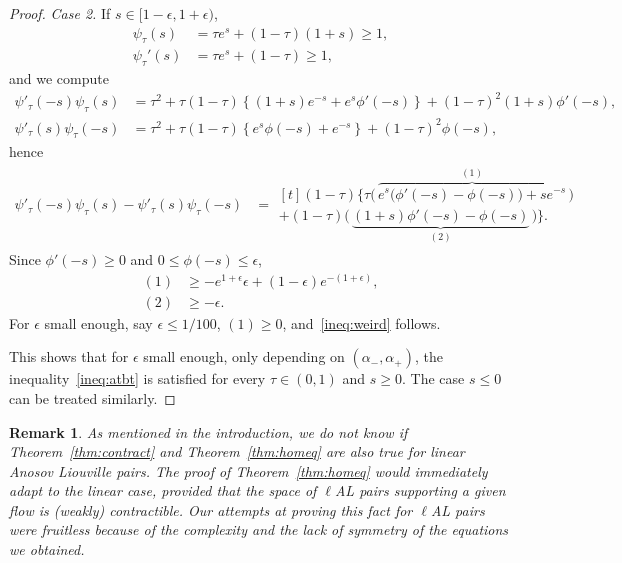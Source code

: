 \documentclass[letterpaper, 11pt]{article}
\numberwithin{equation}{section}
\newtheorem{rem}[thm]{Remark}
\begin{document}
\begin{proof}
\textit{Case 2.} If $s \in [1-\epsilon, 1+\epsilon)$, 
            \begin{align*}
                \psi_\tau(s) &= \tau e^s + (1-\tau) (1+s) \geq 1,\\
                \psi_\tau'(s) &= \tau e^s + (1-\tau) \geq 1,
            \end{align*}
            and we compute
            \begin{align*}
                \psi'_\tau(-s) \psi_\tau(s) &= \tau^2 + \tau(1-\tau) \left\{(1+s) e^{-s} + e^s \phi'(-s) \right\} + (1-\tau)^2 (1+s) \phi'(-s),\\
                \psi'_\tau(s) \psi_\tau(-s) &= \tau^2 + \tau(1-\tau) \left\{e^s \phi(-s) + e^{-s}\right\} + (1-\tau)^2 \phi(-s),
            \end{align*}
            hence
            \begin{align*}
                \psi'_\tau(-s) \psi_\tau(s) - \psi'_\tau(s) \psi_\tau(-s) &= \begin{multlined}[t]  (1-\tau)\Big\{\tau \Big( \, \overset{(1)}{\overbrace{e^s \big(\phi'(-s) - \phi(-s)\big) + s e^{-s}}} \, \Big)  \\ + (1-\tau) \Big( \, \underset{(2)}{\underbrace{(1+s)\phi'(-s) - \phi(-s)}} \, \Big) \Big\}.
                \end{multlined}
            \end{align*}
            Since $\phi'(-s) \geq 0$ and $0 \leq \phi(-s) \leq \epsilon$, 
            \begin{align*}
            \mathrm{(1)} &\geq - e^{1+\epsilon} \epsilon + (1-\epsilon) e^{-(1+\epsilon)}, \\
            \mathrm{(2)} & \geq - \epsilon.
            \end{align*}
            For $\epsilon$ small enough, say $\epsilon \leq 1/100$, $\mathrm{(1)} \geq 0$, and~\eqref{ineq:weird} follows.

This shows that for $\epsilon$ small enough, only depending on $(\alpha_-, \alpha_+)$, the inequality~\eqref{ineq:atbt} is satisfied for every $\tau \in (0,1)$ and $s\geq 0$. The case $s \leq 0$ can be treated similarly.
\end{proof}
	
\begin{rem}
As mentioned in the introduction, we do not know if Theorem~\ref{thm:contract} and Theorem~\ref{thm:homeq} are also true for linear Anosov Liouville pairs. The proof of Theorem~\ref{thm:homeq} would immediately adapt to the linear case, provided that the space of $\ell$AL pairs supporting a given flow is (weakly) contractible. Our attempts at proving this fact for $\ell$AL pairs were fruitless because of the complexity and the lack of symmetry of the equations we obtained.
\end{rem}
\end{document}
